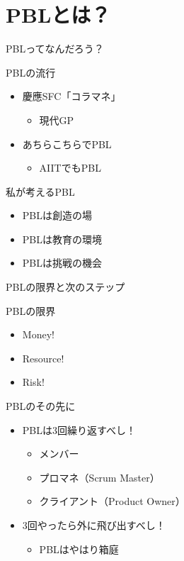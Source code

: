 \documentclass[dvipdfmx]{beamer}
\begin{document}
\section{PBLとは？}
\label{sec-4}
\begin{frame}[label=sec-4-1]{PBLってなんだろう？}
\begin{block}{PBLの流行}
\begin{itemize}
\item 慶應SFC「コラマネ」
\begin{itemize}
\item 現代GP
\end{itemize}
\item あちらこちらでPBL
\begin{itemize}
\item AIITでもPBL
\end{itemize}
\end{itemize}
\end{block}
\begin{block}{私が考えるPBL}
\begin{itemize}
\item PBLは創造の場
\item PBLは教育の環境
\item PBLは挑戦の機会
\end{itemize}
\end{block}
\end{frame}
\begin{frame}[label=sec-4-2]{PBLの限界と次のステップ}
\begin{block}{PBLの限界}
\begin{itemize}
\item Money!
\item Resource!
\item Risk!
\end{itemize}
\end{block}
\begin{block}{PBLのその先に}
\begin{itemize}
\item PBLは3回繰り返すべし！
\begin{itemize}
\item メンバー
\item プロマネ（Scrum Master）
\item クライアント（Product Owner）
\end{itemize}
\item 3回やったら外に飛び出すべし！
\begin{itemize}
\item PBLはやはり箱庭
\end{itemize}
\end{itemize}
\end{block}
\end{frame}
\end{document}
